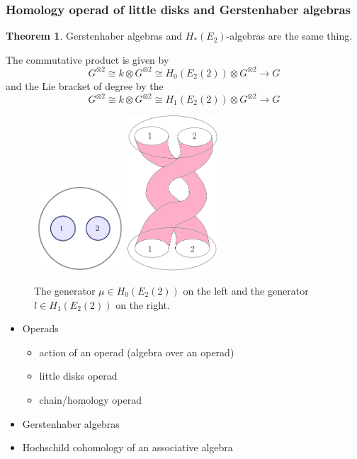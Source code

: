\documentclass{beamer}
\theoremstyle{definition}
\newtheorem{teorema}{Theorem}
\begin{document}
\begin{frame}
	\frametitle{Homology operad of little disks and Gerstenhaber algebras}
	
	\begin{teorema}
		Gerstenhaber algebras and $H_*(E_2)$-algebras are the same thing.
	\end{teorema}\pause 
	The commutative product is given by 
	\[
	G^{\otimes 2}\cong k\otimes G^{\otimes 2}\cong H_0(E_2(2))\otimes G^{\otimes 2}\to G
	\]
	\pause
	and the Lie bracket of degree by the
	\[
	G^{\otimes 2}\cong k\otimes G^{\otimes 2}\cong H_1(E_2(2))\otimes G^{\otimes 2}\to G
	\]
\end{frame}

\begin{frame}
	\begin{figure}
		\includegraphics[width=0.3\textwidth]{Imagenes/genera}
		\includegraphics[width=0.3\textwidth]{Imagenes/generador}
		\caption{The generator $\mu\in H_0(E_2(2))$ on the left and the generator $l\in H_1(E_2(2))$ on the right.}
	\end{figure}
\end{frame}

\begin{frame}
	\begin{itemize}
		\item Operads \checkmark
		\begin{itemize}
			\item action of an operad (algebra over an operad) \checkmark
			\item little disks operad \checkmark
			\item chain/homology operad	\checkmark		
		\end{itemize}
		\item Gerstenhaber algebras \checkmark
		\item Hochschild cohomology of an associative algebra
	\end{itemize}
\end{frame}
\end{document}
